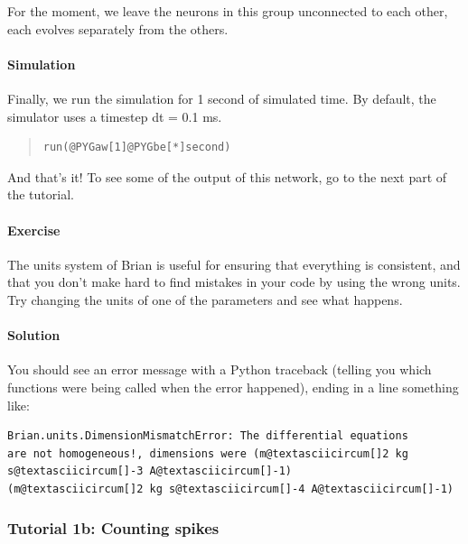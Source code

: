 \documentclass[letterpaper,10pt,english]{manual}
\begin{document}
For the moment, we leave the neurons in this group unconnected
to each other, each evolves separately from the others.


\paragraph{Simulation}

Finally, we run the simulation for 1 second of simulated time.
By default, the simulator uses a timestep dt = 0.1 ms.
\begin{quote}

\begin{Verbatim}[commandchars=@\[\]]
run(@PYGaw[1]@PYGbe[*]second)
\end{Verbatim}
\end{quote}

And that's it! To see some of the output of this network, go
to the next part of the tutorial.


\paragraph{Exercise}

The units system of Brian is useful for ensuring that everything
is consistent, and that you don't make hard to find mistakes in
your code by using the wrong units. Try changing the units of one
of the parameters and see what happens.


\paragraph{Solution}

You should see an error message with a Python traceback (telling
you which functions were being called when the error happened),
ending in a line something like:

\begin{Verbatim}[commandchars=@\[\]]
Brian.units.DimensionMismatchError: The differential equations
are not homogeneous!, dimensions were (m@textasciicircum[]2 kg s@textasciicircum[]-3 A@textasciicircum[]-1)
(m@textasciicircum[]2 kg s@textasciicircum[]-4 A@textasciicircum[]-1)
\end{Verbatim}

\resetcurrentobjects


\subsubsection{Tutorial 1b: Counting spikes}
\end{document}
